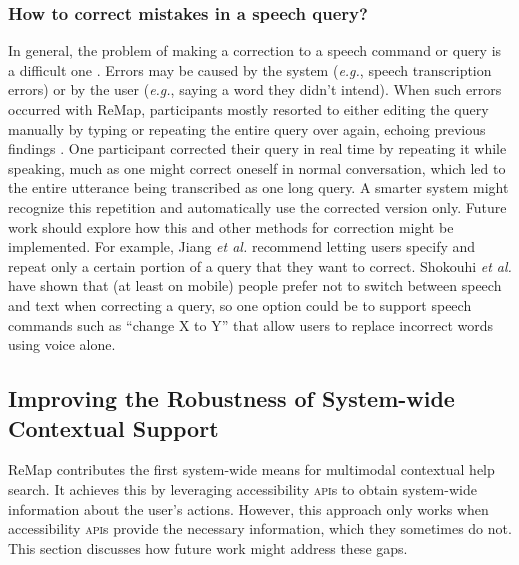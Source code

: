 \subsubsection{How to correct mistakes in a speech query?}
In general, the problem of making a correction to a speech command or query is a difficult one \cite{Myers2018, Jiang2013, Paek2008}. Errors may be caused by the system (\textit{e.g.}, speech transcription errors) or by the user (\textit{e.g.}, saying a word they didn't intend). When such errors occurred with ReMap, participants mostly resorted to either editing the query manually by typing or repeating the entire query over again, echoing previous findings \cite{Myers2018, Jiang2013}. One participant corrected their query in real time by repeating it while speaking, much as one might correct oneself in normal conversation, which led to the entire utterance being transcribed as one long query. A smarter system might recognize this repetition and automatically use the corrected version only. Future work should explore how this and other methods for correction might be implemented. For example, Jiang \textit{et al.} \cite{Jiang2013} recommend letting users specify and repeat only a certain portion of a query that they want to correct. Shokouhi \textit{et al.} \cite{Shokouhi2014} have shown that (at least on mobile) people prefer not to switch between speech and text when correcting a query, so one option could be to support speech commands such as ``change X to Y'' that allow users to replace incorrect words using voice alone.



\subsection{Improving the Robustness of System-wide Contextual Support}
ReMap contributes the first system-wide means for multimodal contextual help search. It achieves this by leveraging accessibility \textsc{api}s to obtain system-wide information about the user's actions. However, this approach only works when accessibility \textsc{api}s provide the necessary information, which they sometimes do not. This section discusses how future work might address these gaps.

